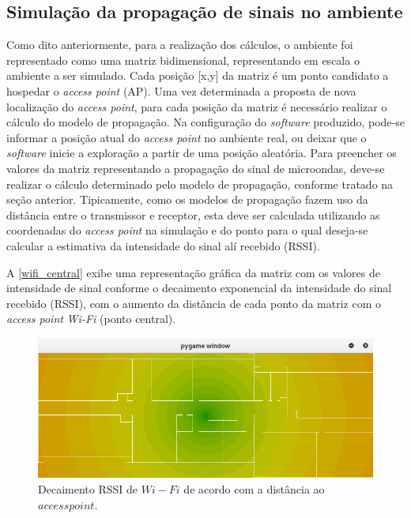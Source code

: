 \documentclass[
	12pt,				%
	twoside,			%
	a4paper,			%
	english,			%
	french,				%
	spanish,			%
	brazil				%
	]{abntex2}
\begin{document}
\subsection{Simulação da propagação de sinais no
ambiente}\label{simulauxe7uxe3o-da-propagauxe7uxe3o-de-sinais-no-ambiente}

Como dito anteriormente, para a realização dos cálculos, o ambiente foi
representado como uma matriz bidimensional, representando em escala o
ambiente a ser simulado. Cada posição {[}x,y{]} da matriz é um ponto
candidato a hospedar o \emph{access point} (AP). Uma vez determinada a
proposta de nova localização do \emph{access point}, para cada posição
da matriz é necessário realizar o cálculo do modelo de propagação. Na
configuração do \emph{software} produzido, pode-se informar a posição
atual do \emph{access point} no ambiente real, ou deixar que o
\emph{software} inicie a exploração a partir de uma posição aleatória.
Para preencher os valores da matriz representando a propagação do sinal
de microondas, deve-se realizar o cálculo determinado pelo modelo de
propagação, conforme tratado na seção anterior. Tipicamente, como os
modelos de propagação fazem uso da distância entre o transmissor e
receptor, esta deve ser calculada utilizando as coordenadas do
\emph{access point} na simulação e do ponto para o qual deseja-se
calcular a estimativa da intensidade do sinal alí recebido (RSSI).

A \autoref{wifi_central} exibe uma representação gráfica da matriz com
os valores de intensidade de sinal conforme o decaimento exponencial da
intensidade do sinal recebido (RSSI), com o aumento da distância de cada
ponto da matriz com o \emph{access point} \emph{Wi-Fi} (ponto central).

\begin{figure}[htb]
    \caption{\label{wifi_central} Decaimento RSSI de $Wi-Fi$ de acordo com a distância ao $access point$.}
    \begin{center}
        \includegraphics[scale=0.5]{imagens/wifi-central.jpg}
    \end{center}
\end{figure}
\end{document}
